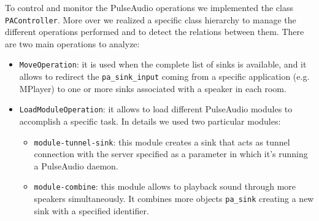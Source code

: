 \documentclass[conference]{IEEEtran}
\begin{document}
To control and monitor the PulseAudio operations we implemented the class \texttt{PAController}. More over we realized a specific class hierarchy to manage the different operations performed and to detect the relations between them. There are two main operations to analyze:
\begin{itemize}
\item \texttt{MoveOperation}: it is used when the complete list of sinks is available, and it allows to redirect the \texttt{pa\_sink\_input} coming from a specific application (e.g. MPlayer) to one or more sinks associated with a speaker in each room. 
\item \texttt{LoadModuleOperation}: it allows to load different PulseAudio modules to accomplish a specific task. In details we used two particular modules:
	\begin{itemize}
	\item \texttt{module-tunnel-sink}: this module creates a sink that acts as tunnel connection with the server specified as a parameter in which it's running a PulseAudio daemon.
	\item \texttt{module-combine}: this module allows to playback sound through more speakers simultaneously. It combines more objects \texttt{pa\_sink} creating a new sink with a specified identifier.
	\end{itemize}
\end{itemize}


%
\end{document}
